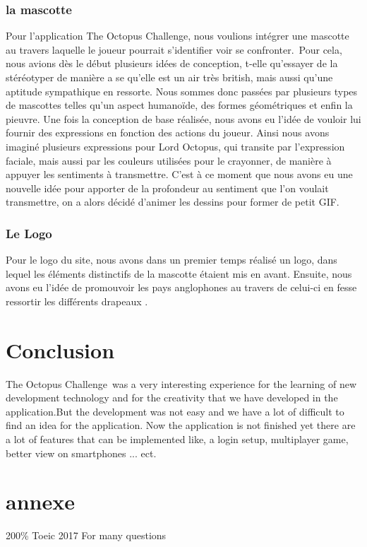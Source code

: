 \documentclass[a4paper,11pt, oneside]{book}
\def\appName{The Octopus Challenge}
\def\octopusName{Lord Octopus}
\begin{document}
\subsection*{la mascotte}
Pour l’application \appName, nous voulions intégrer une mascotte au travers laquelle le joueur pourrait s’identifier voir se confronter.\
Pour cela, nous avions dès le début plusieurs idées de conception, t-elle qu’essayer de la stéréotyper de manière a se qu’elle est un air très british, mais aussi qu’une aptitude sympathique en ressorte.
Nous sommes donc passées par plusieurs types de mascottes telles qu’un aspect humanoïde, des formes géométriques et enfin la pieuvre.
Une fois la conception de base réalisée, nous avons eu l’idée de vouloir lui fournir des expressions en fonction des actions du joueur.
Ainsi nous avons imaginé plusieurs expressions pour \octopusName, qui transite par l’expression faciale, mais aussi par les couleurs utilisées pour le crayonner, de manière à appuyer les sentiments à transmettre. C’est à ce moment que nous avons eu une nouvelle idée pour apporter de la profondeur au sentiment que l’on voulait transmettre, on a alors décidé d’animer les dessins pour former de petit GIF.

\subsection*{Le Logo}
Pour le logo du site, nous avons dans un premier temps réalisé un logo, dans lequel les éléments distinctifs de la mascotte étaient mis en avant.
Ensuite, nous avons eu l’idée de promouvoir les pays anglophones au travers de celui-ci en fesse ressortir les différents drapeaux .


\chapter{Conclusion}
\appName \ was a very interesting experience for the learning of new development technology and for the creativity that we have developed in the application.But the development was not easy and we have a lot of difficult to find an idea for the application.
Now the application is not finished yet there are a lot of features that can be implemented like, a login setup, multiplayer game, better view on smartphones ... ect.

\chapter{annexe}
200\% Toeic 2017 For many questions
\end{document}
